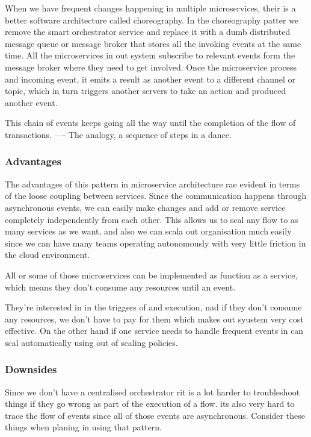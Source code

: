 \documentclass[a4paper, 11pt]{book}
\begin{document}
    When we have frequent changes happening in multiple microservices, their is a better software architecture called choreography.
    In the choreography patter we remove the smart orchestrator service and replace it with a dumb distributed message queue or message broker that stores all the invoking events at the same time.
    All the microservices in out system subscribe to relevant events form the message broker where they need to get involved.
    Once the microservice process and incoming event, it emits a result as another event to a different channel or topic, which in turn triggers another servers to take an action and produced another event.

    This chain of events keeps going all the way until the completion of the flow of transactions.
    ---- The analogy, a sequence of steps in a dance.

    \subsubsection{Advantages}
    The advantages of this pattern in microservice architecture rae evident in terms of the loose coupling between services.
    Since the communication happens through asynchronous events, we can easily make changes and add or remove service completely independently from each other.
    This allows us to scal any flow to as many services as we want, and also we can scala out organisation much easily since we can have many teams operating autonomously with very little friction in the cloud environment.

    All or some of those microservices can be implemented as function as a service, which means they don't consume any resources until an event.

    They're interested in in the triggers of and execution, nad if they don't consume any resources, we don't have to pay for them which makes out syustem very cost effective.
    On the other hand if one service needs to handle frequent events in can scal automatically using out of scaling policies.

    \subsubsection{Downsides}
    Since we don't have a centralised orchestrator rit is a lot harder to troubleshoot things if they go wrong as part of the execution of a flow.
    its also very hard to trace the flow of events since all of those events are asynchronous.
    Consider these things when planing in using that pattern.
\end{document}
